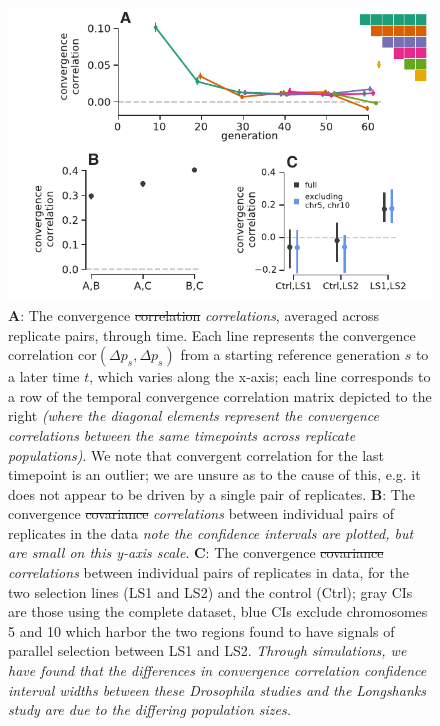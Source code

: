 \documentclass[11pt]{article}
\newcommand{\vb}[1]{{\it \color{blue} #1}}
\providecommand{\DIFaddtex}[1]{{\protect\color{blue}\uwave{#1}}} %
\providecommand{\DIFdeltex}[1]{{\protect\color{red}\sout{#1}}}                      %
\providecommand{\DIFaddFL}[1]{\DIFadd{#1}} %
\providecommand{\DIFdelFL}[1]{\DIFdel{#1}} %
\providecommand{\DIFaddbeginFL}{} %
\providecommand{\DIFaddendFL}{} %
\providecommand{\DIFdelbeginFL}{} %
\providecommand{\DIFdelendFL}{} %
\providecommand{\DIFadd}[1]{\texorpdfstring{\DIFaddtex{#1}}{#1}} %
\providecommand{\DIFdel}[1]{\texorpdfstring{\DIFdeltex{#1}}{}} %
\begin{document}
\begin{figure}[!htb]
  \centering
  \DIFdelbeginFL %
\DIFdelendFL \DIFaddbeginFL \includegraphics[width=\textwidth]{figures/figure-2-revision.pdf}
\DIFaddendFL 

  \caption{{\bf A}: The convergence \DIFdelbeginFL \DIFdelFL{correlation}\DIFdelendFL \DIFaddbeginFL \vb{correlations}\DIFaddendFL , averaged across
    \textcite{Barghi2019-qy} replicate pairs, through time. Each line
    represents the convergence correlation $\mathrm{cor}(\Delta p_{s}, \Delta
    p_{s})$ from a starting reference generation $s$ to a later time $t$, which
    varies along the x-axis; each line corresponds to a row of the temporal
    convergence correlation matrix depicted to the right \DIFaddbeginFL \vb{(where the
      diagonal elements represent the convergence correlations between the same
      timepoints across replicate populations)}\DIFaddendFL . We note that convergent
      correlation for the last timepoint is an outlier; we are unsure as to the
      cause of this, e.g. it does not appear to be driven by a single pair of
      replicates. {\bf B}: The convergence \DIFdelbeginFL \DIFdelFL{covariance }\DIFdelendFL \DIFaddbeginFL \vb{correlations} \DIFaddendFL between individual
      pairs of replicates in the \textcite{Kelly2019-dc} data \DIFaddbeginFL \DIFaddFL{(}\vb{note the
      confidence intervals are plotted, but are small on this y-axis scale}\DIFaddFL{)}\DIFaddendFL .
      {\bf C}:  The convergence \DIFdelbeginFL \DIFdelFL{covariance }\DIFdelendFL \DIFaddbeginFL \vb{correlations} \DIFaddendFL between individual pairs of
      replicates in \parencite{Castro2019-uk} data, for the two selection lines
      (LS1 and LS2) and the control (Ctrl); gray CIs are those using the
      complete dataset, blue CIs exclude chromosomes 5 and 10 which harbor the
      two regions \textcite{Castro2019-uk} found to have signals of parallel
      selection between LS1 and LS2. \DIFaddbeginFL \vb{Through simulations, we have found
        that the differences in convergence correlation confidence interval
        widths between these \emph{Drosophila} studies and the Longshanks study
        are due to the differing population sizes.}\DIFaddendFL }

  \label{fig:figure-2}
\end{figure}
\end{document}
